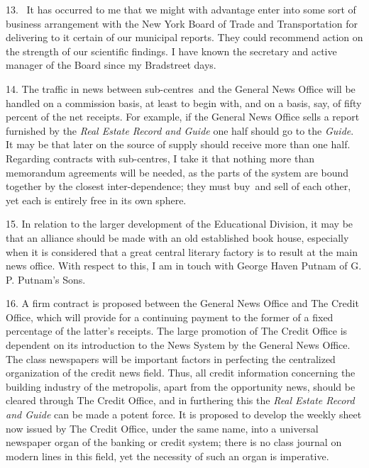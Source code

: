 \documentclass[openany,nobib]{tufte-book}
\begin{document}
13.~ It has occurred to me that we might with advantage enter into some
sort of business arrangement with the New York Board of Trade and
Transportation for delivering to it certain of our municipal reports.
They could recommend action on the strength of our scientific findings.
I have known the secretary and active manager of the Board since my
Bradstreet days.~

14. The traffic in news between sub-centres~and the General News Office
will be handled on a commission basis, at least to begin with, and on a
basis, say, of fifty percent of the net receipts. For example, if the
General News Office sells a report furnished by the \emph{Real Estate
Record and Guide} one half should go to the \emph{Guide}. It may be that
later on the source of supply should receive more than one half.
Regarding contracts with sub-centres, I take it that nothing more than
memorandum agreements will be needed, as the parts of the system are
bound together by the closest inter-dependence; they must buy~and sell
of each other, yet each is entirely free in its own sphere.~

15. In relation to the larger development of the Educational Division,
it may be that an alliance should be made with an old established book
house, especially when it is considered that a great central literary
factory is to result at the main news office. With respect to this, I am
in touch with George Haven Putnam of G. P. Putnam's Sons.~

16. A firm contract is proposed between the General News Office and The
Credit Office, which will provide for a continuing payment to the former
of a fixed percentage of the latter's receipts. The large promotion of
The Credit Office is dependent on its introduction to the News System by
the General News Office. The class newspapers will be important factors
in perfecting the centralized organization of the credit news field.
Thus, all credit information concerning the building industry of the
metropolis, apart from the opportunity news, should be cleared through
The Credit Office, and in furthering this the \emph{Real Estate Record
and Guide} can be made a potent force. It is proposed to develop the
weekly sheet now issued by The Credit Office, under the same name, into
a universal newspaper organ of the banking or credit system; there is no
class journal on modern lines in this field, yet the necessity of such
an organ is imperative.~
\end{document}
